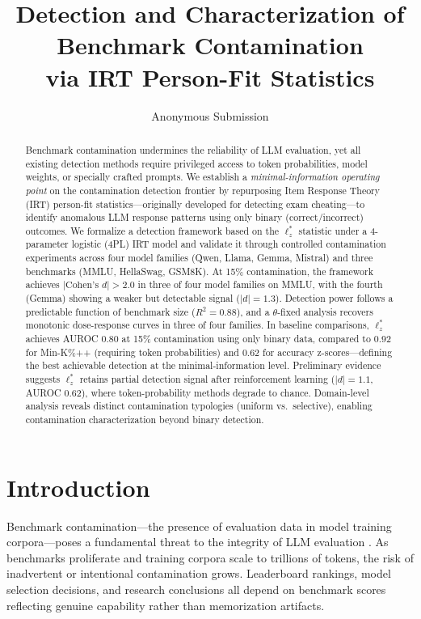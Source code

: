 \documentclass[11pt,a4paper]{article}
\title{Detection and Characterization of Benchmark Contamination\\via IRT Person-Fit Statistics}
\author{
  Anonymous Submission
}
\date{}
\begin{document}
\maketitle

\begin{abstract}
Benchmark contamination undermines the reliability of LLM evaluation, yet all existing detection methods require privileged access to token probabilities, model weights, or specially crafted prompts.
We establish a \emph{minimal-information operating point} on the contamination detection frontier by repurposing Item Response Theory (IRT) person-fit statistics---originally developed for detecting exam cheating---to identify anomalous LLM response patterns using only binary (correct/incorrect) outcomes.
We formalize a detection framework based on the $\ell_z^*$ statistic under a 4-parameter logistic (4PL) IRT model and validate it through controlled contamination experiments across four model families (Qwen, Llama, Gemma, Mistral) and three benchmarks (MMLU, HellaSwag, GSM8K).
At 15\% contamination, the framework achieves $|\text{Cohen's } d| > 2.0$ in three of four model families on MMLU, with the fourth (Gemma) showing a weaker but detectable signal ($|d|=1.3$).
Detection power follows a predictable function of benchmark size ($R^2=0.88$), and a $\theta$-fixed analysis recovers monotonic dose-response curves in three of four families.
In baseline comparisons, $\ell_z^*$ achieves AUROC 0.80 at 15\% contamination using only binary data, compared to 0.92 for Min-K\%++ (requiring token probabilities) and 0.62 for accuracy z-scores---defining the best achievable detection at the minimal-information level.
Preliminary evidence suggests $\ell_z^*$ retains partial detection signal after reinforcement learning ($|d|=1.1$, AUROC 0.62), where token-probability methods degrade to chance.
Domain-level analysis reveals distinct contamination typologies (uniform vs.\ selective), enabling contamination characterization beyond binary detection.
\end{abstract}

\section{Introduction}

Benchmark contamination---the presence of evaluation data in model training corpora---poses a fundamental threat to the integrity of LLM evaluation \citep{sainz2023chatgpt,magar2022data}.
As benchmarks proliferate and training corpora scale to trillions of tokens, the risk of inadvertent or intentional contamination grows.
Leaderboard rankings, model selection decisions, and research conclusions all depend on benchmark scores reflecting genuine capability rather than memorization artifacts.
\end{document}

